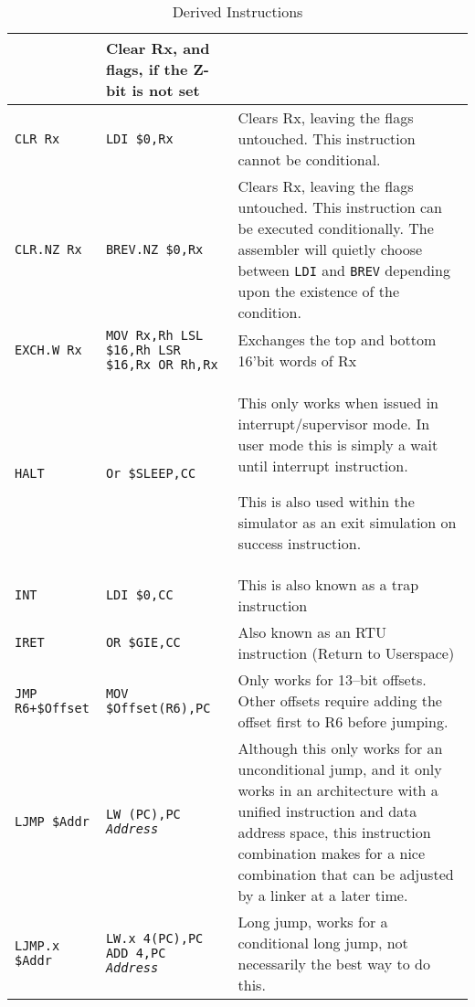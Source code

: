\documentclass{gqtekspec}
\begin{document}
\begin{table}
\begin{center}
\begin{tabular}{p{1.0in}p{1.5in}p{3in}}
	& Clear Rx, and flags, if the Z-bit is not set \\\hline
{\tt CLR Rx }
	& {\tt LDI \$0,Rx}
	& Clears Rx, leaving the flags untouched.  This instruction cannot be
		conditional. \\\hline
{\tt CLR.NZ Rx }
	& {\tt BREV.NZ \$0,Rx}
	& Clears Rx, leaving the flags untouched.  This instruction can be
		executed conditionally. The assembler will quietly  choose
		between {\tt LDI} and {\tt BREV} depending upon the existence
		of the condition.\\\hline
{\tt EXCH.W Rx }
	& \parbox[t]{1.5in}{\tt MOV Rx,Rh \\
		LSL \$16,Rh \\
		LSR \$16,Rx \\
		OR Rh,Rx }
	& Exchanges the top and bottom 16'bit words of Rx \\\hline
{\tt HALT }
	& {\tt Or \$SLEEP,CC}
	& This only works when issued in interrupt/supervisor mode.  In user
	mode this is simply a wait until interrupt instruction.

	This is also used within the simulator as an exit simulation on
	success instruction.\\\hline
{\tt INT } & {\tt LDI \$0,CC} & This is also known as a trap instruction\\\hline
{\tt IRET}
	& {\tt OR \$GIE,CC}
	& Also known as an RTU instruction (Return to Userspace) \\\hline
\hbox{\tt JMP R6+\$Offset}
	& {\tt MOV \$Offset(R6),PC}
	& Only works for 13--bit offsets.  Other offsets require adding the
	offset first to R6 before jumping.\\\hline
{\tt LJMP \$Addr}
	& \parbox[t]{1.5in}{\tt LW (PC),PC \\ {\em Address }}
	& Although this only works for an unconditional jump, and it only
	works in an architecture with a unified instruction and data address
	space, this instruction combination makes for a nice combination that
	can be adjusted by a linker at a later time.\\\hline
{\tt LJMP.x \$Addr}
	& \parbox[t]{1.5in}{\tt LW.x 4(PC),PC \\ ADD 4,PC \\ {\em Address }}
	& Long jump, works for a conditional long jump, not necessarily the best way to do this.  \\\hline
\end{tabular}
\caption{Derived Instructions}\label{tbl:derived-1}
\end{center}\end{table}
\end{document}
